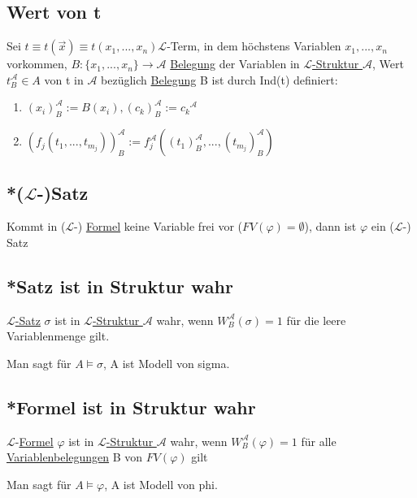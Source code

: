 \documentclass[12pt,a4paper]{article} %
\begin{document}
	\subsection{Wert von t}
	Sei $t \equiv t(\overrightarrow{x}) \equiv t(x_1, ..., x_n) \hyperref[Term]{\mathcal{L}}$-Term, in dem höchstens Variablen $x_1, ..., x_n$ vorkommen, $B: \{x_1, ..., x_n\} \rightarrow \mathcal{A}$ \hyperref[Belegung]{Belegung} der Variablen in \hyperref[Struktur]{$\mathcal{L}$-Struktur $\mathcal{A}$}, Wert $t_B^{\mathcal{A}} \in A$ von t in $\mathcal{A}$ bezüglich \hyperref[Belegung]{Belegung} B ist durch Ind(t) definiert: 
	\begin{enumerate}
		\item $(x_i)_B^{\mathcal{A}} := B(x_i), (c_k)_B^{\mathcal{A}} := {c_k}^{\mathcal{A}}$
		\item $(f_j(t_1, ..., t_{m_j}))_B^{\mathcal{A}} := f_j^{\mathcal{A}}((t_1)_B^{\mathcal{A}}, ..., (t_{m_j})_B^{\mathcal{A}})$
	\end{enumerate}

	\subsection{*($\mathcal{L}$-)Satz}
	\label{LSatz}
	Kommt in ($\mathcal{L}$-) \hyperref[Formel]{Formel} keine Variable frei vor ($FV(\varphi) = \emptyset$), dann ist $\varphi$ ein ($\mathcal{L}$-) Satz
	
	\subsection{*Satz ist in Struktur wahr}
	\hyperref[LSatz]{$\mathcal{L}$-Satz} $\sigma$ ist in \hyperref[Struktur]{$\mathcal{L}$-Struktur $\mathcal{A}$} wahr, wenn $W_B^{\mathcal{A}}(\sigma) = 1$ für die leere Variablenmenge gilt.
	
	Man sagt für $A \hyperref[Erfullbar]{\vDash} \sigma$, A ist Modell von sigma.
	
	\subsection{*Formel ist in Struktur wahr}
	$\mathcal{L}$-\hyperref[Formel]{Formel} $\varphi$ ist in \hyperref[Struktur]{$\mathcal{L}$-Struktur $\mathcal{A}$} wahr, wenn $W_B^{\mathcal{A}}(\varphi) = 1$ für alle \hyperref[Belegung]{Variablenbelegungen} B von $FV(\varphi)$ gilt
	
	Man sagt für $A \hyperref[Erfullbar]{\vDash} \varphi$, A ist Modell von phi.
	
\end{document}
